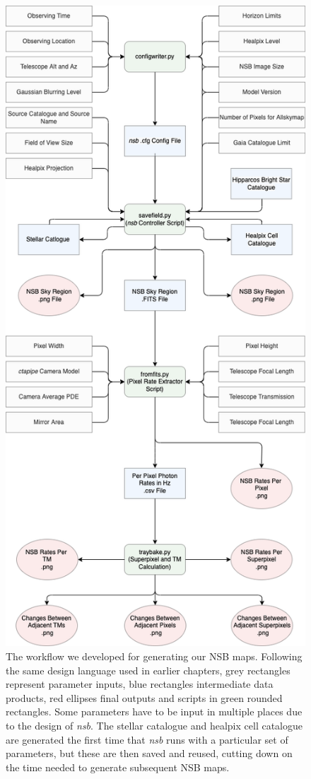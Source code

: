 \begin{figure}[t!] 
        \centering \includegraphics[width=0.58\columnwidth]{figures/Moonlight_workflow.png}

        \caption{
                \label{fig:Moonlight_workflow} The workflow we developed for generating our NSB maps. Following the same design language used in earlier chapters, grey rectangles represent parameter inputs, blue rectangles intermediate data products, red ellipses final outputs and scripts in green rounded rectangles. Some parameters have to be input in multiple places due to the design of \textit{nsb}. The stellar catalogue and healpix cell catalogue are generated the first time that \textit{nsb} runs with a particular set of parameters, but these are then saved and reused, cutting down on the time needed to generate subsequent NSB maps.
        }
\end{figure}

